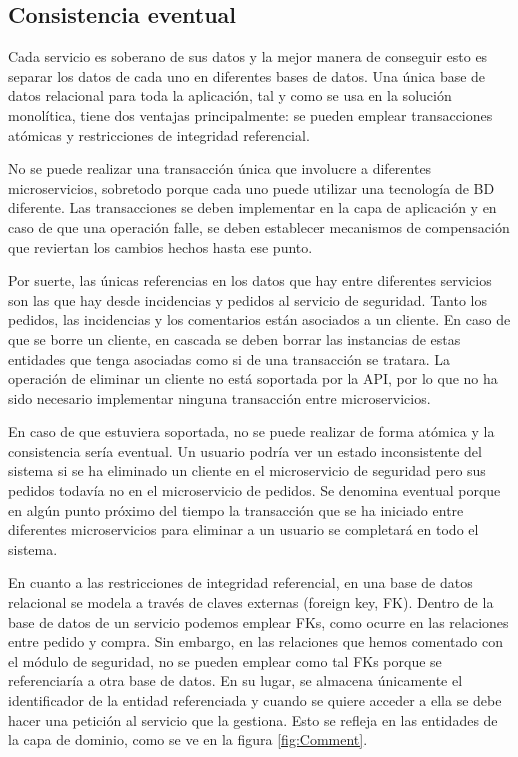 \documentclass[11pt,spanish,listoffigures]{tfgetsinf}
\begin{document}
\subsection{Consistencia eventual}

Cada servicio es soberano de sus datos y la mejor manera de conseguir esto es separar los datos de cada uno en diferentes bases de datos. Una única base de datos relacional para toda la aplicación, tal y como se usa en la solución monolítica, tiene dos ventajas principalmente: se pueden emplear transacciones atómicas y restricciones de integridad referencial. 

No se puede realizar una transacción única que involucre a diferentes microservicios, sobretodo porque cada uno puede utilizar una tecnología de BD diferente. Las transacciones se deben implementar en la capa de aplicación y en caso de que una operación falle, se deben establecer mecanismos de compensación que reviertan los cambios hechos hasta ese punto. \cite{DelaTorre2018}

Por suerte, las únicas referencias en los datos que hay entre diferentes servicios son las que hay desde incidencias y pedidos al servicio de seguridad. Tanto los pedidos, las incidencias y los comentarios están asociados a un cliente. En caso de que se borre un cliente, en cascada se deben borrar las instancias de estas entidades que tenga asociadas como si de una transacción se tratara. La operación de eliminar un cliente no está soportada por la API, por lo que no ha sido necesario implementar ninguna transacción entre microservicios.

En caso de que estuviera soportada, no se puede realizar de forma atómica y la consistencia sería eventual. Un usuario podría ver un estado inconsistente del sistema si se ha eliminado un cliente en el microservicio de seguridad pero sus pedidos todavía no en el microservicio de pedidos. Se denomina eventual porque en algún punto próximo del tiempo la transacción que se ha iniciado entre diferentes microservicios para eliminar a un usuario se completará en todo el sistema.

En cuanto a las restricciones de integridad referencial, en una base de datos relacional se modela a través de claves externas (foreign key, FK). Dentro de la base de datos de un servicio podemos emplear FKs, como ocurre en las relaciones entre pedido y compra. Sin embargo, en las relaciones que hemos comentado con el módulo de seguridad, no se pueden emplear como tal FKs porque se referenciaría a otra base de datos. En su lugar, se almacena únicamente el identificador de la entidad referenciada y cuando se quiere acceder a ella se debe hacer una petición al servicio que la gestiona. Esto se refleja en las entidades de la capa de dominio, como se ve en la figura \ref{fig:Comment}.
\end{document}
